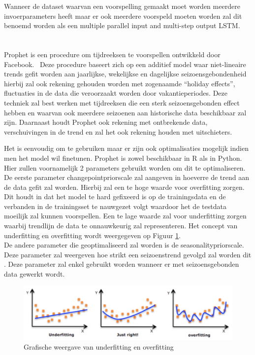 Wanneer de dataset waarvan een voorspelling gemaakt moet worden meerdere invoerparameters heeft maar er  ook meerdere voorspeld moeten worden zal dit benoemd worden als een multiple parallel input and multi-step output LSTM.

\section{}

Prophet is een procedure om tijdreeksen te voorspellen ontwikkeld door Facebook.~\autocite{Prophet2020} Deze procedure baseert zich op een additief model waar niet-lineaire trends gefit worden aan jaarlijkse, wekelijkse en dagelijkse seizoensgebondenheid hierbij zal ook rekening gehouden worden met zogenaamde ``holiday effects'', fluctuaties in de data die veroorzaakt worden door vakantieperiodes. Deze techniek zal best werken met tijdreeksen die een sterk seizoensgebonden effect hebben en waarvan ook meerdere seizoenen aan historische data beschikbaar zal zijn. Daarnaast houdt Prophet ook rekening met ontbrekende data, verschuivingen in de trend en zal het ook rekening houden met uitschieters. 

Het is eenvoudig om te gebruiken maar er zijn ook optimalisaties mogelijk indien men het model wil finetunen. Prophet is zowel beschikbaar in R als in Python.
\\

Hier zullen voornamelijk 2 parameters gebruikt worden om dit te optimaliseren.
De eerste parameter changepoint\textunderscore prior\textunderscore scale zal aangeven in hoeverre de trend aan de data gefit zal worden. Hierbij zal een te hoge waarde voor overfitting zorgen. Dit houdt in dat het model te hard gefixeerd is op de trainingsdata en de verbanden in de trainingsset te nauwgezet volgt waardoor het de testdata moeilijk zal kunnen voorspellen. Een te lage waarde  zal voor underfitting zorgen waarbij trendlijn de data te onnauwkeurig zal representeren. Het concept van underfitting en overfitting wordt weergegeven op Figuur \ref{fig:fittingcurve}.\\

De andere parameter die geoptimaliseerd zal worden is de seasonality\textunderscore prior\textunderscore scale. Deze parameter zal weergeven hoe strikt een seizoenstrend gevolgd zal worden dit . Deze parameter zal enkel gebruikt worden wanneer er met seizoensgebonden data gewerkt wordt.


\begin{figure}
    \centering
    \caption{Grafische weergave van underfitting en overfitting ~\autocite{Decorte2019}}
    \label{fig:fittingcurve}
    \includegraphics[width=1\linewidth]{fittingcurve}
\end{figure}



